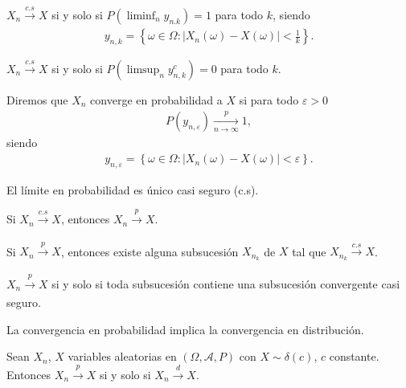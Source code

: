 \begin{teo}
    $X_n \xrightarrow[]{c.s} X$ si y solo si $P(\liminf_n y_{n.k}) = 1$ para todo $k$, siendo
    \begin{align*}
        y_{n,k} = \left\{ \omega \in \Omega : |X_n(\omega) - X(\omega)| < \frac{1}{k} \right\}.
    \end{align*}
\end{teo}

\begin{teo}
    $X_n \xrightarrow[]{c.s} X$ si y solo si $P(\limsup_n y_{n,k}^c) = 0$ para todo $k$.
\end{teo}

\begin{defi}
    Diremos que $X_n$ converge en probabilidad a $X$ si para todo $\varepsilon > 0$
    \begin{align*}
        P(y_{n,\varepsilon}) \xrightarrow[n\to \infty]{p} 1,
    \end{align*}
    siendo
    \begin{align*}
        y_{n,\varepsilon} = \left\{ \omega \in \Omega : |X_n(\omega) - X(\omega)| < \varepsilon \right\}.
    \end{align*}
\end{defi}

\begin{teo}
    El límite en probabilidad es único casi seguro (c.s).
\end{teo}

\begin{teo}
    Si $X_n \xrightarrow[]{c.s} X$, entonces $X_n \xrightarrow[]{p} X$.
\end{teo}

\begin{teo}
    Si $X_n \xrightarrow[]{p} X$, entonces existe alguna subsucesión $X_{n_k}$ de $X$ tal que $X_{n_k} \xrightarrow[]{c.s} X$.
\end{teo}

\begin{teo}
    $X_n \xrightarrow[]{p} X$ si y solo si toda subsucesión contiene una subsucesión convergente casi seguro.
\end{teo}

\begin{teo}
    La convergencia en probabilidad implica la convergencia en distribución.
\end{teo}

\begin{teo}
    Sean $X_n$, $X$ variables aleatorias en $(\Omega, \mathcal{A}, P)$ con $X \sim \delta(c)$, $c$ constante. Entonces $X_n \xrightarrow[]{p} X$ si y solo si $X_n \xrightarrow[]{d} X$.
\end{teo}

